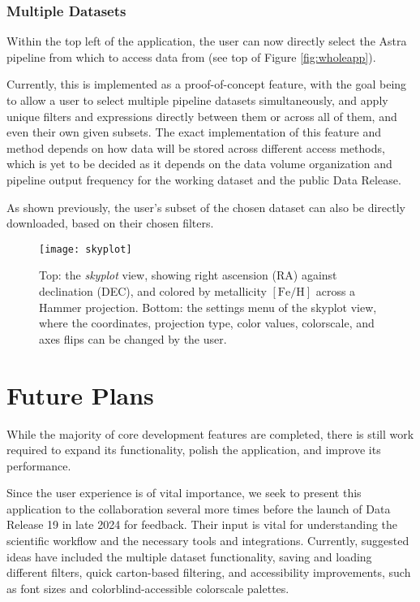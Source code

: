 \documentclass[a4paper,10pt,twocolumn]{article}
\begin{document}
\subsubsection{Multiple Datasets}
\label{sec:datasets}
Within the top left of the application, the user can now directly select the Astra pipeline from which to access data from (see top of Figure \ref{fig:wholeapp}).

Currently, this is implemented as a proof-of-concept feature, with the goal being to allow a user to select multiple pipeline datasets simultaneously, and apply unique filters and expressions directly between them or across all of them, and even their own given subsets.
The exact implementation of this feature and method depends on how data will be stored across different access methods, which is yet to be decided as it depends on the data volume organization and pipeline output frequency for the working dataset and the public Data Release.

As shown previously, the user's subset of the chosen dataset can also be directly downloaded, based on their chosen filters.
\begin{figure}[tp]
	\centering
	\texttt{[image: skyplot]}
	\caption{Top: the \emph{skyplot} view, showing right ascension (RA) against declination (DEC), and colored by metallicity $\mathrm{[Fe / H]}$ across a Hammer projection. Bottom: the settings menu of the skyplot view, where the coordinates, projection type, color values, colorscale, and axes flips can be changed by the user.}
	\label{fig:skyplot}
\end{figure}

\section{Future Plans}
\label{sec:future}
While the majority of core development features are completed, there is still work required to expand its functionality, polish the application, and improve its performance.

Since the user experience is of vital importance, we seek to present this application to the collaboration several more times before the launch of Data Release 19 in late 2024 for feedback. Their input is vital for understanding the scientific workflow and the necessary tools and integrations. Currently, suggested ideas have included the multiple dataset functionality, saving and loading different filters, quick carton-based filtering, and accessibility improvements, such as font sizes and colorblind-accessible colorscale palettes.
\end{document}
